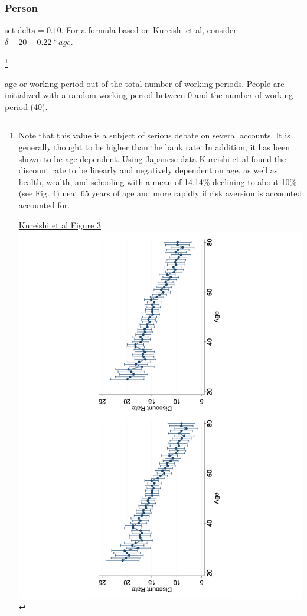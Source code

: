 \subsubsection{Person}
\begin{description}
{\color{red}
\item[subjective discount rate] set $\mathrm{delta} = 0.10$.  For a formula based on Kureishi et al, consider $\delta- 20-0.22*age$.}
\footnote{Note that this value is a subject of serious debate on several accounts. It is generally thought to be higher than the bank rate. In addition, it has been shown to be age-dependent. Using Japanese data Kureishi et al \cite{kureishiTimePreferencesLife2021} found the discount rate to be linearly and negatively dependent on age, as well as health, wealth, and schooling with a mean of 14.14\%  declining %
to about 10\% (see Fig. 4) neat 65 years of age and more rapidly if risk aversion is accounted accounted for. 

 \underline{Kureishi et al Figure 3} \includegraphics[scale=.35, angle=-90, trim= 5cm  0cm 5cm 0cm,clip]{fig/age_dependent_discount_rates.pdf}
}



\item[working period] age or working period out of the total number of working periods. People are initialized with a random working period between 0 and the number of working period (40).
\end{description}

